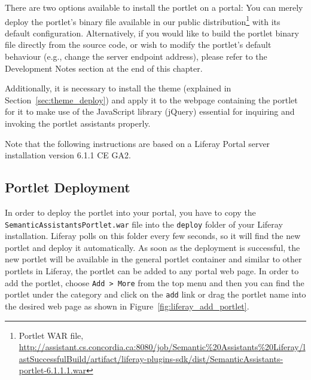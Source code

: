 There are two options available to install the \sa portlet on a portal: You can merely deploy the portlet's binary file available in our public distribution\footnote{\sa Portlet WAR file, \url{http://assistant.cs.concordia.ca:8080/job/Semantic\%20Assistants\%20Liferay/lastSuccessfulBuild/artifact/liferay-plugins-sdk/dist/SemanticAssistants-portlet-6.1.1.1.war}} with its default configuration. Alternatively, if you would like to build the portlet binary file directly from the source code, or wish to modify the portlet's default behaviour (e.g., change the \sa server endpoint address), please refer to the Development Notes section at the end of this chapter.

Additionally, it is necessary to install the \sa theme (explained in Section~\ref{sec:theme_deploy}) and apply it to the webpage containing the \sa portlet for it to make use of the JavaScript library (jQuery) essential for inquiring and invoking the \sa portlet assistants properly. 

Note that the following instructions are based on a Liferay Portal server installation version 6.1.1 CE GA2. 

\subsection{\sa Portlet Deployment}
In order to deploy the \sa portlet into your portal, you have to copy the \texttt{SemanticAssistantsPortlet.war} file into the \texttt{deploy} folder of your Liferay installation. Liferay polls on this folder every few seconds, so it will find the new portlet and deploy it automatically. As soon as the deployment is successful, the new portlet will be available in the general portlet container and similar to other portlets in Liferay, the \sa portlet can be added to any portal web page. In order to add the \sa portlet, choose \texttt{Add \textgreater~More} from the top menu and then you can find the portlet under the \sa category and click on the \texttt{add} link or drag the portlet name into the desired web page as shown in Figure~\ref{fig:liferay_add_portlet}.

